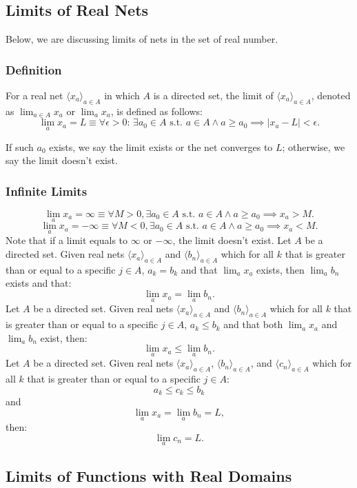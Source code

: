 \documentclass[a4paper,12pt]{report}
\begin{document}
\subsection{Limits of Real Nets}
Below, we are discussing limits of nets in the set of real number.
\subsubsection{Definition}
For a real net $\langle x_a\rangle_{a\in A}$ in which $A$ is a directed set, the limit of $\langle x_a\rangle_{a\in A}$, denoted as $\lim_{a\in A} x_a$ or $\lim_a x_a$, is defined as follows:
\[\lim_ax_a = L \equiv \forall \epsilon > 0:\, \exists a_0 \in A\text{\ s.t.\ } a\in A\land a\ge a_0\implies |x_a - L| < \epsilon.\]

If such $a_0$ exists, we say the limit exists or the net converges to $L$; otherwise, we say the limit doesn't exist.
\subsubsection{Infinite Limits}
\[\lim_{a}x_a=\infty \equiv \forall M > 0, \exists a_0 \in A \text{\ s.t.\ } a\in A\land a\geq a_0 \implies x_a > M.\]
\[\lim_{a}x_a=-\infty \equiv \forall M < 0, \exists a_0 \in A \text{\ s.t.\ } a\in A\land a\geq a_0 \implies x_a < M.\]
Note that if a limit equals to $\infty$ or $-\infty$, the limit doesn't exist.
Let $A$ be a directed set. Given real nets $\langle x_a\rangle_{a\in A}$ and $\langle b_n\rangle_{a\in A}$ which for all $k$ that is greater than or equal to a specific $j\in A$, $a_k=b_k$ and that $\lim_{a}x_a$ exists, then $\lim_{a}b_n$ exists and that:
\[\lim_{a}x_a=\lim_{a}b_n.\]
Let $A$ be a directed set. Given real nets $\langle x_a\rangle_{a\in A}$ and $\langle b_n\rangle_{a\in A}$ which for all $k$ that is greater than or equal to a specific $j\in A$, $a_k\leq b_k$ and that both $\lim_{a}x_a$ and $\lim_{a}b_n$ exist, then:
\[\lim_{a}x_a\leq\lim_{a}b_n.\]
Let $A$ be a directed set. Given real nets $\langle x_a\rangle_{a\in A}$, $\langle b_n\rangle_{a\in A}$, and $\langle c_n\rangle_{a\in A}$ which for all $k$ that is greater than or equal to a specific $j\in A$:
\[a_k\leq c_k\leq b_k\]
and
\[\lim_{a}x_a=\lim_{a}b_n=L,\]
then: 
\[\lim_{a}c_n=L.\]
\subsection{Limits of Functions with Real Domains}
\end{document}

